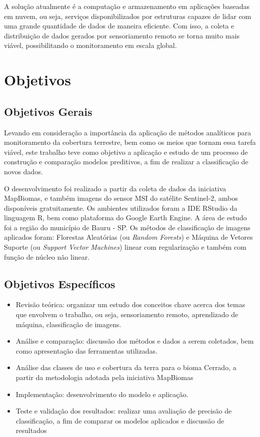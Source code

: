 A solução atualmente é a computação e armazenamento em aplicações
baseadas em nuvem, ou seja, serviços disponibilizados por estruturas
capazes de lidar com uma grande quantidade de dados de maneira
eficiente. Com isso, a coleta e distribuição de dados gerados por
sensoriamento remoto se torna muito mais viável, possibilitando o
monitoramento em escala global. \cite{eoosi}

\section{Objetivos}\label{objetivos}

\subsection{Objetivos Gerais}\label{objetivos-gerais}

Levando em consideração a importância da aplicação de métodos
analíticos para monitoramento da cobertura terrestre, bem como os meios
que tornam essa tarefa viável, este trabalho teve como objetivo a
aplicação e estudo de um processo de construção e comparação modelos
preditivos, a fim de realizar a classificação de novos dados.

O desenvolvimento foi realizado a partir da coleta de dados da
iniciativa MapBiomas, e também imagens do sensor MSI do satélite
Sentinel-2, ambos disponíveis gratuitamente. Os ambientes
utilizados foram a IDE RStudio da linguagem R, bem como
plataforma do Google Earth Engine. A área de estudo foi a região
do município de Bauru - SP. Os métodos de classificação de imagens
aplicados foram: Florestas Aleatórias (ou \emph{Random Forests}) e
Máquina de Vetores Suporte (ou \emph{Support Vector Machines}) linear com regularização e também com função de núcleo não linear.

\subsection{Objetivos Específicos}\label{objetivos-especificos}

\begin{itemize}
\itemsep1pt\parskip0pt
\item
  Revisão teórica: organizar um estudo dos conceitos chave acerca dos
  temas que envolvem o trabalho, ou seja, sensoriamento remoto,
  aprendizado de máquina, classificação de imagens.
\item
  Análise e comparação: discussão dos métodos e dados a serem coletados,
  bem como apresentação das ferramentas utilizadas.
\item
  Análise das classes de uso e cobertura da terra para o bioma Cerrado, a partir da metodologia adotada pela iniciativa MapBiomas
\item
  Implementação: desenvolvimento do modelo e aplicação.
\item
  Teste e validação dos resultados: realizar uma avaliação de precisão
  de classificação, a fim de comparar os modelos aplicados e discussão
  de resultados
\end{itemize}
